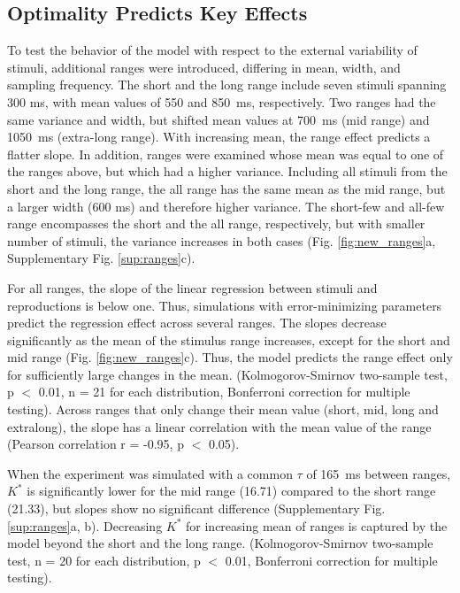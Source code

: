 \documentclass[10pt]{article}
\begin{document}
\subsection{Optimality Predicts Key Effects}
To test the behavior of the model with respect to the external variability of stimuli, additional ranges were introduced, differing in mean, width, and sampling frequency.
The short and the long range include seven stimuli spanning 300 ms, with mean values of 550 and 850~ms, respectively. 
Two ranges had the same variance and width, but shifted mean values at 700~ms (mid range) and 1050~ms (extra-long range). With increasing mean, the range effect predicts a flatter slope. 
In addition, ranges were examined whose mean was equal to one of the ranges above, but which had a higher variance.
Including all stimuli from the short and the long range, the all range has the same mean as the mid range, but a larger width (600 ms) and therefore higher variance.
The short-few and all-few range encompasses the short and the all range, respectively, but with smaller number of stimuli, the variance increases in both cases 
(Fig. \ref{fig:new_ranges}a, Supplementary Fig. \ref{sup:ranges}c).

For all ranges, the slope of the linear regression between stimuli and reproductions is below one. Thus, simulations with error-minimizing parameters predict the regression effect across several ranges. 
The slopes decrease significantly as the mean of the stimulus range increases, except for the short and mid range (Fig. \ref{fig:new_ranges}c).
Thus, the model predicts the range effect only for sufficiently large changes in the mean. 
(Kolmogorov-Smirnov two-sample test, p $<$ 0.01, n = 21 for each distribution, Bonferroni correction for multiple testing).
Across ranges that only change their mean value (short, mid, long and extralong), the slope has a linear correlation with the mean value of the range (Pearson correlation r = -0.95, p $<$ 0.05).

When the experiment was simulated with a common $\tau$ of 165~ms between ranges, $K^*$ is significantly lower for the mid range (16.71) compared to the short range (21.33), but slopes show no significant difference (Supplementary Fig. \ref{sup:ranges}a, b).
Decreasing $K^*$ for increasing mean of ranges is captured by the model beyond the short and the long range.
(Kolmogorov-Smirnov two-sample test, n = 20 for each distribution, p $<$ 0.01, Bonferroni correction for multiple testing).\\
\end{document}
